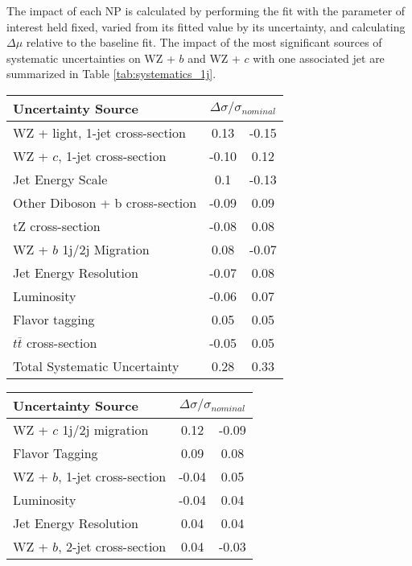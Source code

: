 The impact of each NP is calculated by performing the fit with the parameter of interest held fixed, varied from its fitted value by its uncertainty, and calculating $\Delta\mu$ relative to the baseline fit.  The impact of the most significant sources of systematic uncertainties on WZ + $b$ and WZ + $c$ with one associated jet are summarized in Table \ref{tab:systematics_1j}. 

\begin{table}[H]
      \centering  
      \begin{tabular}{l|cc}
        \hline\hline
        Uncertainty Source & \multicolumn{2}{c}{$\Delta \sigma/\sigma_{nominal}$ }  \\
        \hline
        WZ + light, 1-jet cross-section & 0.13 & -0.15 \\
        WZ + $c$, 1-jet cross-section & -0.10 & 0.12 \\
        Jet Energy Scale & 0.1 & -0.13 \\
        Other Diboson + b cross-section & -0.09 & 0.09 \\
        tZ cross-section & -0.08 & 0.08 \\
        WZ + $b$ 1j/2j Migration & 0.08 & -0.07 \\
        Jet Energy Resolution & -0.07 & 0.08 \\
        Luminosity & -0.06 & 0.07 \\
        Flavor tagging & 0.05 & 0.05 \\
        $t\bar{t}$ cross-section & -0.05 & 0.05 \\
        \hline
        Total Systematic Uncertainty & 0.28 & 0.33 \\
        \hline\hline
      \end{tabular}
      \vspace{0.3in}
      \begin{tabular}{l|cc}
        \hline\hline
        Uncertainty Source & \multicolumn{2}{c}{$\Delta \sigma/\sigma_{nominal}$ }  \\
        \hline
        WZ + $c$ 1j/2j migration & 0.12 & -0.09 \\
        Flavor Tagging & 0.09 & 0.08 \\
        WZ + $b$, 1-jet cross-section & -0.04 & 0.05 \\
        Luminosity & -0.04 & 0.04 \\
        Jet Energy Resolution & 0.04 & 0.04 \\
        WZ + $b$, 2-jet cross-section & 0.04 & -0.03 \\

\end{tabular}
\end{table}
